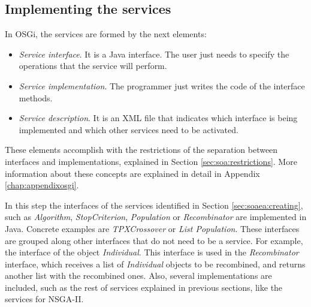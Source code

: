 
 
\subsection{Implementing the services}
\label{sec:osgiliath:implementing}

In OSGi, the services are formed by the next elements:

\begin{itemize}
\item {\em Service interface}. It is a Java interface. The user just needs to specify the operations that the service will perform.
\item {\em Service implementation}. The programmer just writes the code of the interface methods.
\item {\em Service description}. It is an XML file that indicates which
  interface is being implemented and which other services need to be
  activated. 
\end{itemize}
These elements accomplish with the restrictions of the separation between interfaces and implementations, explained in Section \ref{sec:soa:restrictions}. More information about these concepts are explained in detail in Appendix \ref{chap:appendixosgi}. %

In this step the interfaces of the services identified in
Section \ref{sec:soaea:creating}, such as {\em Algorithm}, {\em
  StopCriterion}, {\em Population} or {\em Recombinator} are implemented in Java. Concrete examples are {\em TPXCrossover} or {\em List Population}.
These
interfaces are grouped along other interfaces that do not need to be a
service. For example, the interface of the object {\em
  Individual}. This interface is used in the {\em Recombinator}
interface, which receives a list of {\em Individual} objects to be
recombined, and returns another list with the recombined ones. 
Also, several implementations are included, such as the rest
of  services explained in previous sections, like the services for
NSGA-II. %



